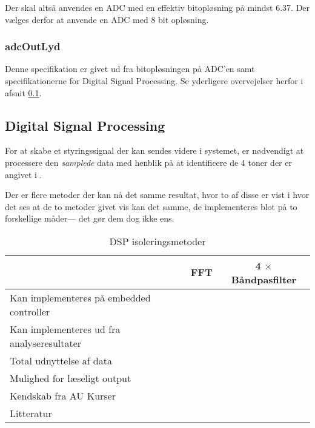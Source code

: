 {Der skal altså anvendes en ADC med en effektiv bitopløsning på mindst 6.37. Der vælges derfor at anvende en ADC med 8 bit opløsning. 

\subsubsection{adcOutLyd}
Denne specifikation er givet ud fra bitopløsningen på ADC'en samt specifikationerne for Digital Signal Processing. Se yderligere overvejelser herfor i afsnit \ref{Digital:Signal:Processing}. 

\subsection{Digital Signal Processing}\label{Digital:Signal:Processing}
For at skabe et styringssignal der kan sendes videre i systemet, er nødvendigt at processere den \emph{samplede} data med henblik på at identificere de 4 toner der er angivet i . %

Der er  flere metoder der kan nå det samme resultat, hvor to af disse er vist i  hvor det ses at de to metoder givet vis kan det samme, de implementeres blot på to forskellige måder--- det gør dem dog ikke ens.

\begin{table}[!h]
	\small
	\centering
	\caption{DSP isoleringsmetoder}
	\label{tab:Styringsenhed:analyse:DSPMetoder}
	\begin{tabular}{lll}
		                                           & \multicolumn{1}{c}{FFT} & \multicolumn{1}{c}{4 $\times$ Båndpasfilter} \\\midrule
		Kan implementeres på embedded controller   & \checkmark              & \checkmark                              \\
		Kan implementeres ud fra analyseresultater & \checkmark              & \checkmark                              \\
		Total udnyttelse af data                   &                         & \checkmark                              \\
		Mulighed for læseligt output                      & \checkmark              & \checkmark                              \\
		Kendskab fra AU Kurser                     & \checkmark              & \checkmark                              \\
		Litteratur                                 & \checkmark              & \checkmark                              \\\bottomrule
	\end{tabular}
\end{table}
}

